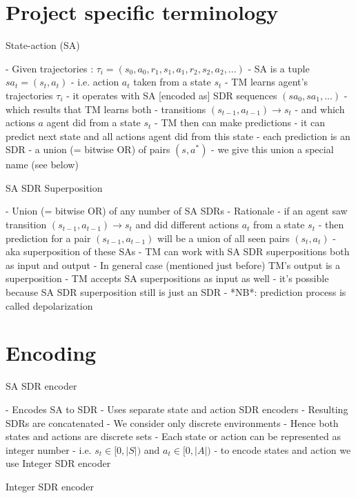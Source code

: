 \documentclass[a4paper]{article}
\begin{document}
\section {Project specific terminology}

State-action (SA)

- Given trajectories : $\tau_i = (s_0, a_0, r_1, s_1, a_1, r_2, s_2, a_2, ...)$
- SA is a tuple $sa_t = (s_t, a_t)$
  - i.e. action $a_t$ taken from a state $s_t$
- TM learns agent's trajectories $\tau_i$
  - it operates with SA [encoded as] SDR sequences $(sa_0, sa_1, ... )$
  - which results that TM learns both
    - transitions $(s_{t-1}, a_{t-1}) \rightarrow s_t$
    - and which actions $a$ agent did from a state $s_t$
- TM then can make predictions
  - it can predict next state and all actions agent did from this state
  - each prediction is an SDR - a union (= bitwise OR) of pairs $(s, a^*)$
  - we give this union a special name (see below)

SA SDR Superposition

- Union (= bitwise OR) of any number of SA SDRs
- Rationale
  - if an agent saw transition $(s_{t-1}, a_{t-1}) \rightarrow s_t$ and did different actions $a_t$ from a state $s_t$
  - then prediction for a pair $(s_{t-1}, a_{t-1})$ will be a union of all seen pairs $(s_t, a_t)$
  - aka superposition of these SAs
- TM can work with SA SDR superpositions both as input and output
  - In general case (mentioned just before) TM's output is a superposition
  - TM accepts SA superpositions as input as well
    - it's possible because SA SDR superposition still is just an SDR
- *NB*: prediction process is called depolarization

\section {Encoding}

SA SDR encoder

- Encodes SA to SDR
- Uses separate state and action SDR encoders
  - Resulting SDRs are concatenated
- We consider only discrete environments
  - Hence both states and actions are discrete sets
- Each state or action can be represented as integer number
  - i.e. $s_t \in [0, |S|)$ and $a_t \in [0, |A|)$
  - to encode states and action we use Integer SDR encoder

Integer SDR encoder
\end{document}
